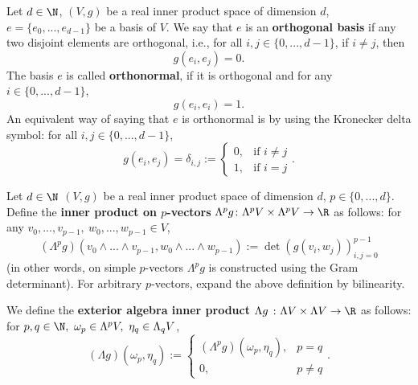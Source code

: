 \begin{definition}
  Let
    $d \in \N$,
    $(V, g)$ be a real inner product space of dimension $d$,
    $e = \{e_0, ..., e_{d - 1}\}$ be a basis of $V$.
  We say that $e$ is an \textbf{orthogonal basis} if any two disjoint elements
  are orthogonal, i.e., for all $i, j \in \{0, ..., d - 1\}$,
  if $i \neq j$, then
  \begin{equation}
    g(e_i, e_j) = 0.
  \end{equation}
  The basis $e$ is called \textbf{orthonormal}, if it is orthogonal and
  for any $i \in \{0, ..., d - 1\}$,
  \begin{equation}
     g(e_i, e_i) = 1.
  \end{equation}
  An equivalent way of saying that $e$ is orthonormal is by using the Kronecker
  delta symbol: for all $i, j \in \{0, ..., d - 1\}$,
  \begin{equation}
    g(e_i, e_j) = \delta_{i, j} :=
    \begin{cases}
      0, & \text{if $i \neq j$} \\
      1, & \text{if $i = j$}
    \end{cases}.
  \end{equation}
\end{definition}
\begin{definition}
  Let
    $d \in \N$
    $(V, g)$ be a real inner product space of dimension $d$,
    $p \in \{0, ..., d\}$.
  Define the \textbf{inner product on $p$-vectors}
  $\Lambda^p g \colon \Lambda^p V \times \Lambda^p V \to \R$ as follows:
  for any $v_0, ..., v_{p - 1},\ w_0, ..., w_{p - 1} \in V$,
  \begin{equation}
    (\Lambda^p g)
    (v_0 \wedge ... \wedge v_{p - 1}, w_0 \wedge ... \wedge w_{p - 1})
    := \det (g(v_i, w_j))_{i, j = 0}^{p - 1}
  \end{equation}
  (in other words, on simple $p$-vectors $\Lambda^p g$ is constructed using
  the Gram determinant).
  For arbitrary $p$-vectors, expand the above definition by bilinearity.

  We define the \textbf{exterior algebra inner product}
  $\Lambda g\ \colon \Lambda V \times \Lambda V \to \R$
  as follows:
  for $p, q \in \N,\ \omega_p \in \Lambda^p V,\ \eta_q \in \Lambda_q V$,
  \begin{equation}
    (\Lambda g)(\omega_p, \eta_q) :=
    \begin{cases}
      (\Lambda^p g)(\omega_p, \eta_q), & p = q \\
      0, & p \neq q
    \end{cases}.
  \end{equation}
\end{definition}
